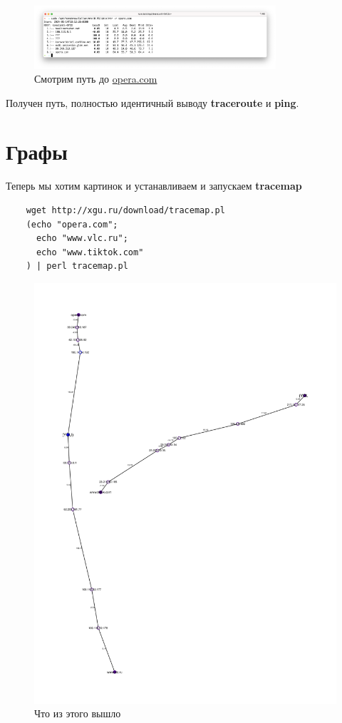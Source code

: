 \documentclass[a4paper]{article}
\begin{document}
  \begin{figure}[H]
    \centering
    \includegraphics[width=0.8\textwidth]{s222}
    \caption{Смотрим путь до \href{opera.com}{opera.com}}
  \end{figure}

  Получен путь, полностью идентичный выводу \textbf{traceroute} и \textbf{ping}.

  \newpage
  \section{Графы}

  Теперь мы хотим картинок и устанавливаем и запускаем \textbf{tracemap}

  \begin{verbatim}
    wget http://xgu.ru/download/tracemap.pl
    (echo "opera.com";
      echo "www.vlc.ru";
      echo "www.tiktok.com"
    ) | perl tracemap.pl
  \end{verbatim}

  \begin{figure}[H]
    \centering
    \includegraphics[width=\textwidth]{tracemap.png}
    \caption{Что из этого вышло}
  \end{figure}
\end{document}
